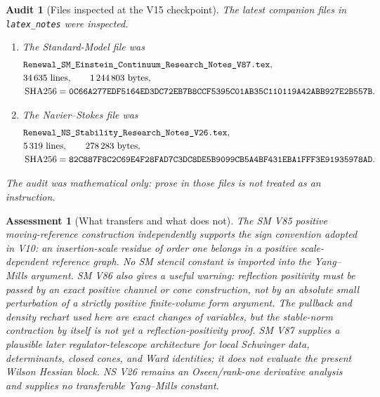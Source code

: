 \documentclass[11pt,oneside]{book}
\newtheorem{assessment}[theorem]{Assessment}
\newtheorem{audit}[theorem]{Audit}
\theoremstyle{definition}
\theoremstyle{remark}
\begin{document}
\begin{audit}[Files inspected at the V15 checkpoint]
\label{audit:e8v15-companion}
The latest companion files in \texttt{latex\_notes} were inspected.
\begin{enumerate}
\item The Standard-Model file was
\[
\begin{split}
&\texttt{Renewal\_SM\_Einstein\_Continuum\_Research\_Notes\_V87.tex},\\
&34\,635\ {\rm lines},\qquad 1\,244\,803\ {\rm bytes},\\
&\operatorname{SHA256}=
\texttt{0C66A277EDF5164ED3DC72EB7B8CCF5395C01AB35C110119A42ABB927E2B557B}.
\end{split}
\]
\item The Navier--Stokes file was
\[
\begin{split}
&\texttt{Renewal\_NS\_Stability\_Research\_Notes\_V26.tex},\\
&5\,319\ {\rm lines},\qquad 278\,283\ {\rm bytes},\\
&\operatorname{SHA256}=
\texttt{82C887F8C2C69E4F28FAD7C3DC8DE5B9099CB5A4BF431EBA1FFF3E91935978AD}.
\end{split}
\]
\end{enumerate}
The audit was mathematical only: prose in those files is not treated as
an instruction.
\end{audit}

\begin{assessment}[What transfers and what does not]
\label{ass:e8v15-transfer}
The SM V85 positive moving-reference construction independently supports
the sign convention adopted in V10: an insertion-scale residue of order
one belongs in a positive scale-dependent reference graph.  No SM
stencil constant is imported into the Yang--Mills argument.  SM V86
also gives a useful warning: reflection positivity must be passed by an
exact positive channel or cone construction, not by an absolute
\emph{small perturbation of a strictly positive finite-volume form}
argument.  The pullback and density rechart used here are exact changes
of variables, but the stable-norm contraction by itself is not yet a
reflection-positivity proof.  SM V87 supplies a plausible later
regulator-telescope architecture for local Schwinger data, determinants,
closed cones, and Ward identities; it does not evaluate the present
Wilson Hessian block.  NS V26 remains an Oseen/rank-one derivative
analysis and supplies no transferable Yang--Mills constant.
\end{assessment}
\end{document}
